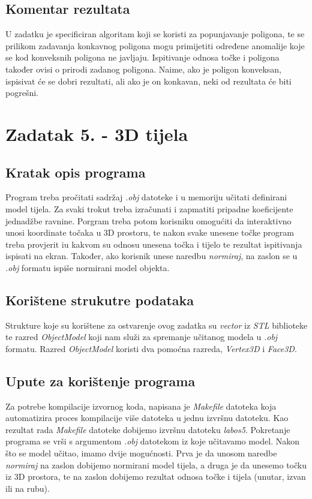 \documentclass[oneside]{scrbook}
\begin{document}
\subsection{Komentar rezultata}
U zadatku je specificiran algoritam koji se koristi za popunjavanje poligona, te se prilikom zadavanja konkavnog poligona mogu primijetiti određene anomalije koje se kod konveksnih poligona ne javljaju. Ispitivanje odnosa točke i poligona također ovisi o prirodi zadanog poligona. Naime, ako je poligon konveksan, ispisivat će se dobri rezultati, ali ako je on konkavan, neki od rezultata će biti pogrešni.

\section{Zadatak 5. - 3D tijela}
\subsection{Kratak opis programa}
Program treba pročitati sadržaj \textit{.obj} datoteke i u memoriju učitati definirani model tijela. Za svaki trokut treba izračunati i zapmatiti pripadne koeficijente jednadžbe ravnine. Porgram treba potom korisniku omogućiti da interaktivno unosi koordinate točaka u 3D prostoru, te nakon svake unesene točke program treba provjerit iu kakvom su odnosu unesena točka i tijelo te rezultat ispitivanja ispisati na ekran. Također, ako korisnik unese naredbu \textit{normiraj}, na zaslon se u \textit{.obj} formatu ispiše normirani model objekta. 

\subsection{Korištene strukutre podataka}
Strukture koje su korištene za ostvarenje ovog zadatka su \textit{vector} iz \textit{STL} biblioteke te razred \textit{ObjectModel} koji nam služi za spremanje učitanog modela u \textit{.obj} formatu. Razred \textit{ObjectModel} koristi dva pomoćna razreda, \textit{Vertex3D} i \textit{Face3D}.

\subsection{Upute za korištenje programa}
Za potrebe kompilacije izvornog koda, napisana je \textit{Makefile} datoteka koja automatizira proces kompilacije više datoteka u jednu izvršnu datoteku. Kao rezultat rada \textit{Makefile} datoteke dobijemo izvršnu datoteku \textit{labos5}. Pokretanje programa se vrši s argumentom \textit{.obj} datotekom iz koje učitavamo model. Nakon što se model učitao, imamo dvije mogućnosti. Prva je da unosom naredbe \textit{normiraj} na zaslon dobijemo normirani model tijela, a druga je da unesemo točku iz 3D prostora, te na zaslon dobijemo rezultat odnosa točke i tijela (unutar, izvan ili na rubu).
\end{document}
